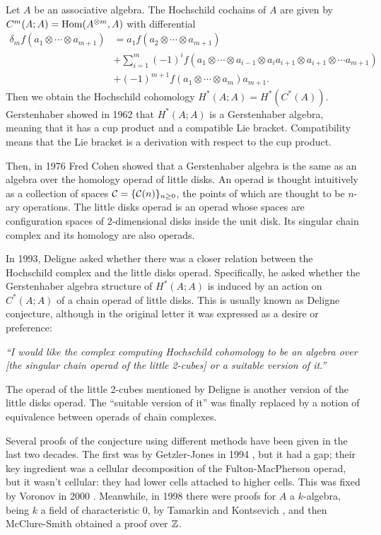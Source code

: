 \documentclass[TFM.tex]{subfiles}
\begin{document}

Let $A$ be an associative algebra. The Hochschild cochains of $A$ are given by $C^m(A;A)=\operatorname{Hom}(A^{\otimes m},A)$ with differential 
\begin{align*}
\delta_m f(a_1\otimes\cdots\otimes a_{m+1})&=a_1f(a_2\otimes\cdots\otimes a_{m+1})\\
& +\sum_{i=1}^m(-1)^if(a_1\otimes\cdots\otimes a_{i-1}\otimes a_ia_{i+1}\otimes a_{i+1}\otimes\cdots a_{m+1})\\
& +(-1)^{m+1}f(a_1\otimes\cdots\otimes a_m)a_{m+1}.
\end{align*}
Then we obtain the Hochschild cohomology $H^*(A;A)=H^*(C^*(A))$. Gerstenhaber showed in 1962 \cite{Gerstenhaber} that $H^*(A;A)$ is a Gerstenhaber algebra, meaning that it has a cup product and a compatible Lie bracket. Compatibility means that the Lie bracket is a derivation with respect to the cup product.

Then, in 1976 Fred Cohen \cite{cuentas} showed that a Gerstenhaber algebra is the same as an algebra over the homology operad of little disks. An operad is thought intuitively as a collection of spaces $\mathcal{C}=\{\mathcal{C}(n)\}_{n\geq 0}$, the points of which are thought to be $n$-ary operations. The little disks operad is an operad whose spaces are configuration spaces of 2-dimensional disks inside the unit disk. Its singular chain complex and its homology are also operads. 

In 1993, Deligne asked \cite{deligne} whether there was a closer relation between the Hochschild complex and the little disks operad. Specifically, he asked whether the Gerstenhaber algebra structure of $H^*(A;A)$ is induced by an action on $C^*(A;A)$ of a chain operad of little disks. This is usually known as Deligne conjecture, although in the original letter it was expressed as a desire or preference:

\emph{``I would
like the complex computing Hochschild cohomology to be an algebra over [the singular chain
operad of the little 2-cubes] or a suitable version of it.''}

The operad of the little 2-cubes mentioned by Deligne is another version of the little disks operad. The ``suitable version of it'' was finally replaced by a notion of equivalence between operads of chain complexes.

Several proofs of the conjecture using different methods have been given in the last two decades. The first was by Getzler-Jones in 1994 \cite{GJ}, but it had a gap; their key ingredient was a cellular decomposition of the Fulton-MacPherson operad, but it wasn’t cellular: they had
lower cells attached to higher cells. This was fixed by Voronov in 2000 \cite{VO}. Meanwhile, in 1998 there were proofs for $A$ a $k$-algebra, being $k$ a field of characteristic 0, by Tamarkin and Kontsevich \cite{tk}, and then McClure-Smith \cite{McClure} obtained a proof over $\mathbb{Z}$.
\end{document}
